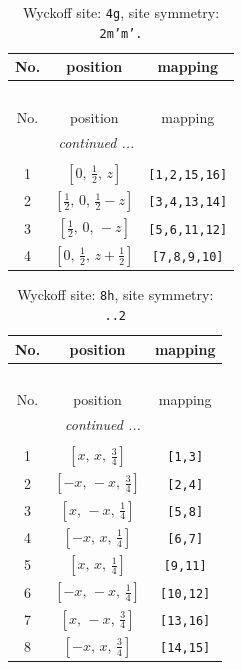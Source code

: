 \documentclass[fleqn,8pt]{jsarticle}
\begin{document}
\renewcommand{\arraystretch}{1.2}
\begin{longtable}{ccc}
\caption{Wyckoff site: {\tt 4g}, site symmetry: {\tt 2m'm'.}}
 \\
 \hline \hline
No. & position & mapping \\ \hline \endfirsthead

\multicolumn{2}{l}{\tablename\ \thetable{}} \\
 \hline \hline
No. & position & mapping \\ \hline \endhead

 \hline \hline
\multicolumn{2}{r}{\footnotesize\it continued ...} \\ \endfoot

 \hline \hline
\multicolumn{2}{r}{} \\ \endlastfoot

1 & $\left[ 0,\, \frac{1}{2},\, z \right]$ & {\tt [1,2,15,16]} \\ \hline
2 & $\left[ \frac{1}{2},\, 0,\, \frac{1}{2} - z \right]$ & {\tt [3,4,13,14]} \\ \hline
3 & $\left[ \frac{1}{2},\, 0,\, - z \right]$ & {\tt [5,6,11,12]} \\ \hline
4 & $\left[ 0,\, \frac{1}{2},\, z + \frac{1}{2} \right]$ & {\tt [7,8,9,10]} \\
\end{longtable}
\renewcommand{\arraystretch}{1.2}
\begin{longtable}{ccc}
\caption{Wyckoff site: {\tt 8h}, site symmetry: {\tt ..2}}
 \\
 \hline \hline
No. & position & mapping \\ \hline \endfirsthead

\multicolumn{2}{l}{\tablename\ \thetable{}} \\
 \hline \hline
No. & position & mapping \\ \hline \endhead

 \hline \hline
\multicolumn{2}{r}{\footnotesize\it continued ...} \\ \endfoot

 \hline \hline
\multicolumn{2}{r}{} \\ \endlastfoot

1 & $\left[ x,\, x,\, \frac{3}{4} \right]$ & {\tt [1,3]} \\ \hline
2 & $\left[ - x,\, - x,\, \frac{3}{4} \right]$ & {\tt [2,4]} \\ \hline
3 & $\left[ x,\, - x,\, \frac{1}{4} \right]$ & {\tt [5,8]} \\ \hline
4 & $\left[ - x,\, x,\, \frac{1}{4} \right]$ & {\tt [6,7]} \\ \hline
5 & $\left[ x,\, x,\, \frac{1}{4} \right]$ & {\tt [9,11]} \\ \hline
6 & $\left[ - x,\, - x,\, \frac{1}{4} \right]$ & {\tt [10,12]} \\ \hline
7 & $\left[ x,\, - x,\, \frac{3}{4} \right]$ & {\tt [13,16]} \\ \hline
8 & $\left[ - x,\, x,\, \frac{3}{4} \right]$ & {\tt [14,15]} \\
\end{longtable}
\end{document}
